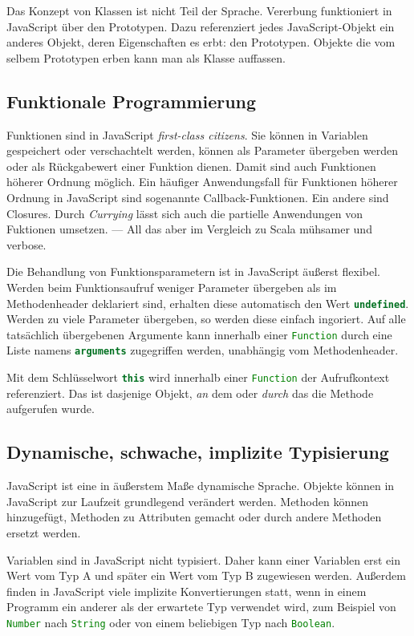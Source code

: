 \documentclass[a4paper, 12pt, hidelinks, listof=totoc, listoftables=totoc, bibliography=totoc]{scrreprt}
\newcommand{\js}[1]{\lstinline[language=JavaScript, style=inline]|#1|}
\begin{document}
Das Konzept von Klassen ist nicht Teil der Sprache. Vererbung funktioniert in JavaScript über den Prototypen. Dazu referenziert jedes JavaScript-Objekt ein anderes Objekt, deren Eigenschaften es erbt: den Prototypen. Objekte die vom selbem Prototypen erben kann man als Klasse auffassen.\cite{mdn.WWO}\cite[S. 115 ff., S. 199 ff.]{flanagan2011.JDG}

\subsection{Funktionale Programmierung}

Funktionen sind in JavaScript \textit{first-class citizens}. Sie können in Variablen gespeichert oder verschachtelt werden, können als Parameter übergeben werden oder als Rückgabewert einer Funktion dienen. Damit sind auch Funktionen höherer Ordnung möglich. Ein häufiger Anwendungsfall für Funktionen höherer Ordnung in JavaScript sind sogenannte Callback-Funktionen. Ein andere sind Closures. Durch \textit{Currying} lässt sich auch die partielle Anwendungen von Fuktionen umsetzen. --- All das aber im Vergleich zu Scala mühsamer und verbose.

Die Behandlung von Funktionsparametern ist in JavaScript äußerst flexibel. Werden beim Funktionsaufruf weniger Parameter übergeben als im Methodenheader deklariert sind, erhalten diese automatisch den Wert \js{undefined}. Werden zu viele Parameter übergeben, so werden diese einfach ingoriert. Auf alle tatsächlich übergebenen Argumente kann innerhalb einer \js{Function} durch eine Liste namens \js{arguments} zugegriffen werden, unabhängig vom Methodenheader.

Mit dem Schlüsselwort \js{this} wird innerhalb einer \js{Function} der Aufrufkontext referenziert. Das ist dasjenige Objekt, \textit{an} dem oder \textit{durch} das die Methode aufgerufen wurde. 
\cite[199 ff.]{flanagan2011.JDG}

\subsection{Dynamische, schwache, implizite Typisierung}

JavaScript ist eine in äußerstem Maße dynamische Sprache. Objekte können in JavaScript zur Laufzeit grundlegend verändert werden. Methoden können hinzugefügt, Methoden zu Attributen gemacht oder durch andere Methoden ersetzt werden.

Variablen sind in JavaScript nicht typisiert. Daher kann einer Variablen erst ein Wert vom Typ A und später ein Wert vom Typ B zugewiesen werden. Außerdem finden in JavaScript viele implizite Konvertierungen statt, wenn in einem Programm ein anderer als der erwartete Typ verwendet wird, zum Beispiel von \js{Number} nach \js{String} oder von einem beliebigen Typ nach \js{Boolean}.
\end{document}
